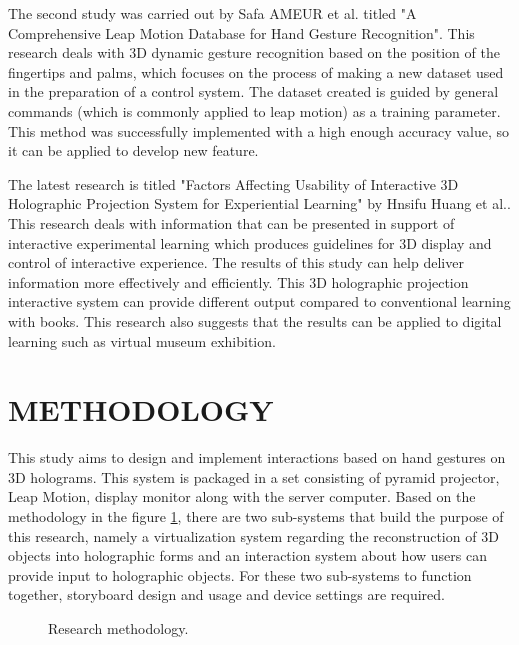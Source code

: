 \documentclass[conference]{IEEEtran}
\begin{document}
	The second study was carried out by Safa AMEUR et al. titled "A Comprehensive Leap Motion Database for Hand Gesture Recognition"\cite{ameur2016comprehensive}. This research deals with 3D dynamic gesture recognition based on the position of the fingertips and palms, which focuses on the process of making a new dataset used in the preparation of a control system. The dataset created is guided by general commands (which is commonly applied to leap motion) as a training parameter. This method was successfully implemented with a high enough accuracy value, so it can be applied to develop new feature\cite{ameur2016comprehensive}.
	
	The latest research is titled "Factors Affecting Usability of Interactive 3D Holographic Projection System for Experiential Learning" by Hnsifu Huang et al.\cite{huang2018factors}. This research deals with information that can be presented in support of interactive experimental learning which produces guidelines for 3D display and control of interactive experience. The results of this study can help deliver information more effectively and efficiently. This 3D holographic projection interactive system can provide different output compared to conventional learning with books. This research also suggests that the results can be applied to digital learning such as virtual museum exhibition\cite{huang2018factors}.
	
\section{METHODOLOGY}
	This study aims to design and implement interactions based on hand gestures on 3D holograms. This system is packaged in a set consisting of pyramid projector, Leap Motion, display monitor along with the server computer. Based on the methodology in the figure \ref{fig:metodologi}, there are two sub-systems that build the purpose of this research, namely a virtualization system regarding the reconstruction of 3D objects into holographic forms and an interaction system about how users can provide input to holographic objects. For these two sub-systems to function together, storyboard design and usage and device settings are required.
	\vspace{-2ex}
	\begin{figure}[h]
		\caption{Research methodology.}
		\label{fig:metodologi}
	\end{figure}
	\vspace{-2ex}
	
\end{document}
